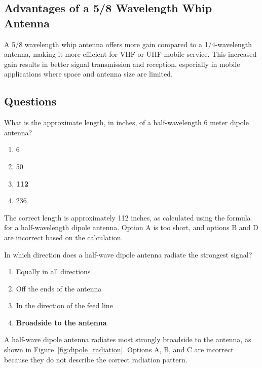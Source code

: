 \subsection*{Advantages of a 5/8 Wavelength Whip Antenna}
A 5/8 wavelength whip antenna offers more gain compared to a 1/4-wavelength antenna, making it more efficient for VHF or UHF mobile service. This increased gain results in better signal transmission and reception, especially in mobile applications where space and antenna size are limited.

\subsection*{Questions}
\begin{tcolorbox}[colback=gray!10!white,colframe=black!75!black,title={T9A09}]
What is the approximate length, in inches, of a half-wavelength 6 meter dipole antenna?
\begin{enumerate}[label=\Alph*,noitemsep]
    \item 6
    \item 50
    \item \textbf{112}
    \item 236
\end{enumerate}
\end{tcolorbox}
The correct length is approximately 112 inches, as calculated using the formula for a half-wavelength dipole antenna. Option A is too short, and options B and D are incorrect based on the calculation.


\begin{tcolorbox}[colback=gray!10!white,colframe=black!75!black,title={T9A10}]
In which direction does a half-wave dipole antenna radiate the strongest signal?
\begin{enumerate}[label=\Alph*,noitemsep]
    \item Equally in all directions
    \item Off the ends of the antenna
    \item In the direction of the feed line
    \item \textbf{Broadside to the antenna}
\end{enumerate}
\end{tcolorbox}
A half-wave dipole antenna radiates most strongly broadside to the antenna, as shown in Figure~\ref{fig:dipole_radiation}. Options A, B, and C are incorrect because they do not describe the correct radiation pattern.

